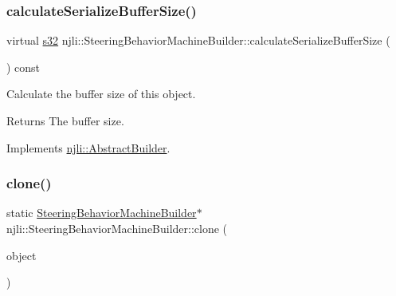 \mbox{\label{classnjli_1_1_steering_behavior_machine_builder_a0e58242742971d09f8951c4b4337c7d4}} 
\subsubsection{\texorpdfstring{calculate\+Serialize\+Buffer\+Size()}{calculateSerializeBufferSize()}}
{\footnotesize\ttfamily virtual \mbox{\hyperlink{_util_8h_aa62c75d314a0d1f37f79c4b73b2292e2}{s32}} njli\+::\+Steering\+Behavior\+Machine\+Builder\+::calculate\+Serialize\+Buffer\+Size (\begin{DoxyParamCaption}{ }\end{DoxyParamCaption}) const\hspace{0.3cm}{\ttfamily [virtual]}}

Calculate the buffer size of this object.

\begin{DoxyReturn}{Returns}
The buffer size. 
\end{DoxyReturn}


Implements \mbox{\hyperlink{classnjli_1_1_abstract_builder_aa1d220053e182c37b31b427499c6eacf}{njli\+::\+Abstract\+Builder}}.

\mbox{\label{classnjli_1_1_steering_behavior_machine_builder_a16ab8af15f21b7d376fec378f5741193}} 
\subsubsection{\texorpdfstring{clone()}{clone()}}
{\footnotesize\ttfamily static \mbox{\hyperlink{classnjli_1_1_steering_behavior_machine_builder}{Steering\+Behavior\+Machine\+Builder}}$\ast$ njli\+::\+Steering\+Behavior\+Machine\+Builder\+::clone (\begin{DoxyParamCaption}\item[{const \mbox{\hyperlink{classnjli_1_1_steering_behavior_machine_builder}{Steering\+Behavior\+Machine\+Builder}} \&}]{object }\end{DoxyParamCaption})\hspace{0.3cm}{\ttfamily [static]}}

